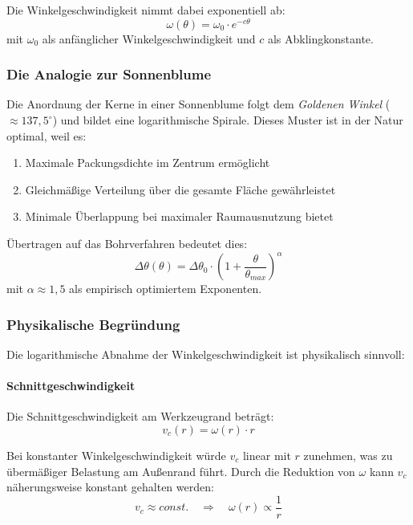 ﻿\documentclass[12pt,a4paper]{article}
\begin{document}
Die Winkelgeschwindigkeit nimmt dabei exponentiell ab:
\begin{equation}
	\omega(\theta) = \omega_0 \cdot e^{-c\theta}
\end{equation}
mit $\omega_0$ als anfänglicher Winkelgeschwindigkeit und $c$ als Abklingkonstante.

\subsubsection{Die Analogie zur Sonnenblume}

Die Anordnung der Kerne in einer Sonnenblume folgt dem \textit{Goldenen Winkel} ($\approx 137{,}5^\circ$) und bildet eine logarithmische Spirale. Dieses Muster ist in der Natur optimal, weil es:
\begin{enumerate}
	\item Maximale Packungsdichte im Zentrum ermöglicht
	\item Gleichmäßige Verteilung über die gesamte Fläche gewährleistet
	\item Minimale Überlappung bei maximaler Raumausnutzung bietet
\end{enumerate}

Übertragen auf das Bohrverfahren bedeutet dies:
\begin{equation}
	\Delta\theta(\theta) = \Delta\theta_0 \cdot \left(1 + \frac{\theta}{\theta_{max}}\right)^{\alpha}
\end{equation}
mit $\alpha \approx 1{,}5$ als empirisch optimiertem Exponenten.

\subsubsection{Physikalische Begründung}

Die logarithmische Abnahme der Winkelgeschwindigkeit ist physikalisch sinnvoll:

\paragraph{Schnittgeschwindigkeit} Die Schnittgeschwindigkeit am Werkzeugrand beträgt:
\begin{equation}
	v_c(r) = \omega(r) \cdot r
\end{equation}

Bei konstanter Winkelgeschwindigkeit würde $v_c$ linear mit $r$ zunehmen, was zu übermäßiger Belastung am Außenrand führt. Durch die Reduktion von $\omega$ kann $v_c$ näherungsweise konstant gehalten werden:
\begin{equation}
	v_c \approx const. \quad \Rightarrow \quad \omega(r) \propto \frac{1}{r}
\end{equation}
\end{document}
